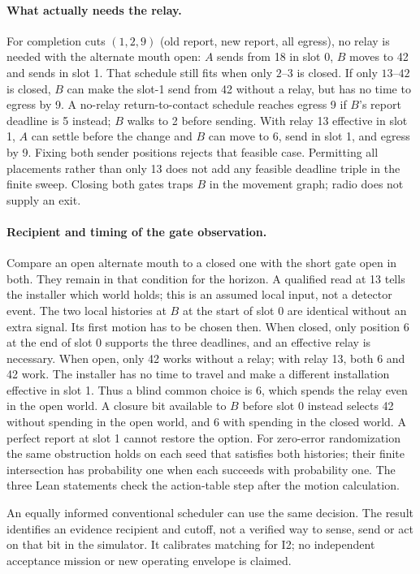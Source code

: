 \documentclass[11pt]{article}
\begin{document}
\paragraph{What actually needs the relay.}
For completion cuts $(1,2,9)$ (old report, new report, all
egress), no relay is needed with the alternate mouth open:
$A$ sends from 18 in slot 0, $B$ moves to 42 and sends in slot 1.
That schedule still fits when only $2$--$3$ is closed.
If only $13$--$42$ is closed, $B$ can make the slot-1 send
from 42 without a relay, but has no time to egress by 9.
A no-relay return-to-contact schedule reaches egress 9 if $B$'s
report deadline is 5 instead; $B$ walks to 2 before sending.
With relay 13 effective in slot 1, $A$ can settle before the
change and $B$ can move to 6, send in slot 1, and egress by 9.
Fixing both sender positions rejects that feasible case.
Permitting all placements rather than only 13 does not add
any feasible deadline triple in the finite sweep. Closing both
gates traps $B$ in the movement graph; radio does not supply an exit.

\paragraph{Recipient and timing of the gate observation.}
Compare an open alternate mouth to a closed one with the
short gate open in both. They remain in that condition for
the horizon. A qualified read at 13 tells the installer which
world holds; this is an assumed local input, not a detector
event. The two local histories at $B$ at the start of slot 0
are identical without an extra signal. Its first motion has
to be chosen then. When closed, only position 6 at the end
of slot 0 supports the three deadlines, and an effective
relay is necessary. When open, only 42 works without a
relay; with relay 13, both 6 and 42 work. The installer has
no time to travel and make a different installation effective
in slot 1. Thus a blind common choice is 6, which spends
the relay even in the open world. A closure bit available to
$B$ before slot 0 instead selects 42 without spending in the
open world, and 6 with spending in the closed world.
A perfect report at slot 1 cannot restore the option. For
zero-error randomization the same obstruction holds on each
seed that satisfies both histories; their finite intersection
has probability one when each succeeds with probability one.
The three Lean statements check the action-table step after
the motion calculation.

An equally informed conventional scheduler can use the
same decision. The result identifies an evidence recipient
and cutoff, not a verified way to sense, send or act on that
bit in the simulator. It calibrates matching for I2; no independent
acceptance mission or new operating envelope is claimed.
\end{document}
